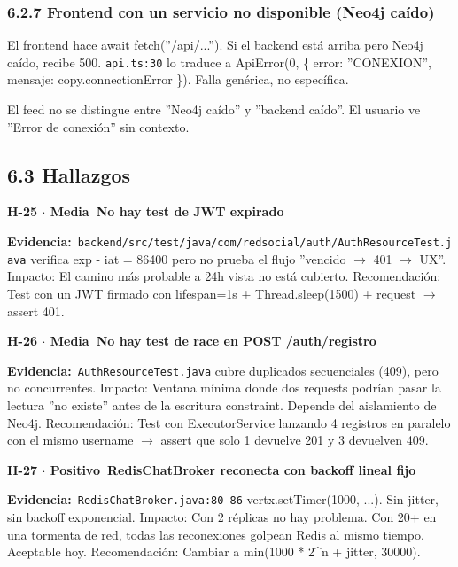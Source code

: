 \documentclass[10pt,a4paper]{article}
\newcommand{\code}[1]{\nolinkurl{#1}}
\newcommand{\badgeMedia}{\colorbox{yellow!35}{\textcolor{brown!90!black}{\textbf{\footnotesize Media}}}}
\newcommand{\badgePositivo}{\colorbox{green!20}{\textcolor{green!60!black}{\textbf{\footnotesize Positivo}}}}
\begin{document}
\subsubsection{6.2.7 Frontend con un servicio no disponible (Neo4j caído)}
El frontend hace await fetch(''/api/...''). Si el backend está arriba pero Neo4j caído, recibe 500. \code{api.ts:30} lo traduce a ApiError(0, \{ error: ''CONEXION'', mensaje: copy.connectionError \}). Falla genérica, no específica.\par\vspace{0.4em}
El feed no se distingue entre ''Neo4j caído'' y ''backend caído''. El usuario ve ''Error de conexión'' sin contexto.\par\vspace{0.4em}
\subsection{6.3 Hallazgos}
\vspace{0.8em}\noindent\textbf{\large H-25 $\cdot$ \badgeMedia\  No hay test de JWT expirado}\par\vspace{0.3em}
\noindent\textbf{Evidencia:}\ \code{backend/src/test/java/com/redsocial/auth/AuthResourceTest.java} verifica exp - iat = 86400 pero no prueba el flujo ''vencido $\rightarrow$ 401 $\rightarrow$ UX''.  Impacto: El camino más probable a 24h vista no está cubierto.  Recomendación: Test con un JWT firmado con lifespan=1s + Thread.sleep(1500) + request $\rightarrow$ assert 401.\par\vspace{0.4em}
\vspace{0.8em}\noindent\textbf{\large H-26 $\cdot$ \badgeMedia\  No hay test de race en POST /auth/registro}\par\vspace{0.3em}
\noindent\textbf{Evidencia:}\ \code{AuthResourceTest.java} cubre duplicados secuenciales (409), pero no concurrentes.  Impacto: Ventana mínima donde dos requests podrían pasar la lectura ''no existe'' antes de la escritura constraint. Depende del aislamiento de Neo4j.  Recomendación: Test con ExecutorService lanzando 4 registros en paralelo con el mismo username $\rightarrow$ assert que solo 1 devuelve 201 y 3 devuelven 409.\par\vspace{0.4em}
\vspace{0.8em}\noindent\textbf{\large H-27 $\cdot$ \badgePositivo\  RedisChatBroker reconecta con backoff lineal fijo}\par\vspace{0.3em}
\noindent\textbf{Evidencia:}\ \code{RedisChatBroker.java:80-86} vertx.setTimer(1000, ...). Sin jitter, sin backoff exponencial.  Impacto: Con 2 réplicas no hay problema. Con 20+ en una tormenta de red, todas las reconexiones golpean Redis al mismo tiempo. Aceptable hoy.  Recomendación: Cambiar a min(1000 * 2\textasciicircum{}n + jitter, 30000).\par\vspace{0.4em}
\end{document}
